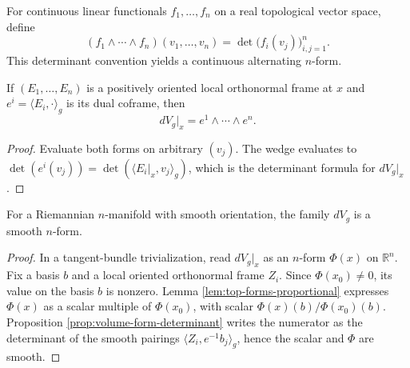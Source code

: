 \begin{definition}
\label{def:wedge-covectors}
\leanok
For continuous linear functionals $f_1,\ldots,f_n$ on a real topological vector space, define
\[
(f_1\wedge\cdots\wedge f_n)(v_1,\ldots,v_n)=\det\bigl(f_i(v_j)\bigr)_{i,j=1}^n.
\]
This determinant convention yields a continuous alternating $n$-form.
\end{definition}

\begin{proposition}
\label{prop:volume-form-coframe}
\leanok
{}
If $(E_1,\ldots,E_n)$ is a positively oriented local orthonormal frame at $x$ and $e^i=\langle E_i,\cdot\rangle_g$ is its dual coframe, then
\[
dV_g|_x=e^1\wedge\cdots\wedge e^n.
\]
\end{proposition}

\begin{proof}
\leanok
{}
\sketch Evaluate both forms on arbitrary $(v_j)$. The wedge evaluates to $\det(e^i(v_j))=\det(\langle E_i|_x,v_j\rangle_g)$, which is the determinant formula for $dV_g|_x$.
\end{proof}

\begin{proposition}
\label{prop:volume-form-smooth}
\leanok
{}
For a Riemannian $n$-manifold with smooth orientation, the family $dV_g$ is a smooth $n$-form.
\end{proposition}

\begin{proof}
\leanok
{}
\sketch In a tangent-bundle trivialization, read $dV_g|_x$ as an $n$-form $\Phi(x)$ on $\mathbb R^n$. Fix a basis $b$ and a local oriented orthonormal frame $Z_i$. Since $\Phi(x_0)\ne0$, its value on the basis $b$ is nonzero. Lemma \ref{lem:top-forms-proportional} expresses $\Phi(x)$ as a scalar multiple of $\Phi(x_0)$, with scalar $\Phi(x)(b)/\Phi(x_0)(b)$. Proposition \ref{prop:volume-form-determinant} writes the numerator as the determinant of the smooth pairings $\langle Z_i,e^{-1}b_j\rangle_g$, hence the scalar and $\Phi$ are smooth.
\end{proof}

